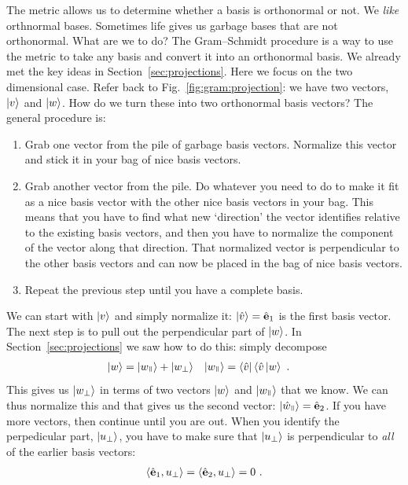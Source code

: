 \documentclass[12pt]{article}
\begin{document}
The metric allows us to determine whether a basis is orthonormal or not. We \emph{like} orthnormal bases. Sometimes life gives us garbage bases that are not orthonormal. What are we to do? The Gram--Schmidt procedure is a way to use the metric to take any basis and convert it into an orthonormal basis. We already met the key ideas in Section~\ref{sec:projections}. Here we focus on the two dimensional case. Refer back to Fig.~\ref{fig:gram:projection}: we have two vectors, $\left|v\right\rangle$ and $\left|w\right\rangle$. How do we turn these into two orthonormal basis vectors?
%
The general procedure is:
\begin{enumerate}
    \item Grab one vector from the pile of garbage basis vectors. Normalize this vector and stick it in your bag of nice basis vectors. 
    \item Grab another vector from the pile. Do whatever you need to do to make it fit as a nice basis vector with the other nice basis vectors in your bag. This means that you have to find what new `direction' the vector identifies relative to the existing basis vectors, and then you have to normalize the component of the vector along that direction. That normalized vector is perpendicular to the other basis vectors and can now be placed in the bag of nice basis vectors.
    \item Repeat the previous step until you have a complete basis. 
\end{enumerate}

We can start with $\left|v\right\rangle$ and simply normalize it: $\left|\hat{v}\right\rangle = \hat{\mathbf{e}}_1$ is the first basis vector. The next step is to pull out the perpendicular part of $\left|w\right\rangle$. In Section~\ref{sec:projections} we saw how to do this: simply decompose
\begin{align}
    \ket{w} &= \ket{w_\paral} + \ket{w_\perp}
    &
    \ket{w_\paral} &=  \bra{\hat v}\la \hat v \ket{w} \ .
\end{align}
This gives us $\left|w_\perp\right\rangle$ in terms of two vectors $\left|w\right\rangle$ and $\ket{w_\paral}$ that we know. We can thus normalize this and that gives us the second vector: $\ket{\hat{w}_\paral} = \bas{e}_2$. If you have more vectors, then continue until you are out. When you identify the perpedicular part, $\left|u_\perp\right\rangle$, you have to make sure that $\left|u_\perp\right\rangle$ is perpendicular to \emph{all} of the earlier basis vectors:
\begin{align}
    \langle \hat{\mathbf{e}}_1, u_\perp \rangle =
    \langle \hat{\mathbf{e}}_2, u_\perp \rangle =
    0 \ .
\end{align}
\end{document}
